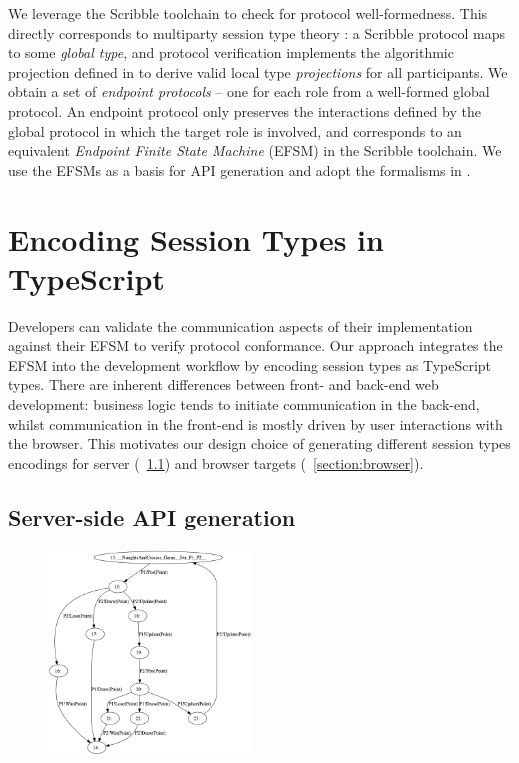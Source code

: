 \documentclass[submission,copyright,creativecommons]{eptcs}
\newcommand{\sectionref}[1]{\textsection~\ref{#1}}
\begin{document}
We leverage the Scribble toolchain to check for protocol
well-formedness.
This directly corresponds to multiparty session
type theory \cite{MPST}: 
a Scribble protocol maps to some \textit{global type}, and protocol verification implements the algorithmic projection
defined in \cite{MPST} to derive valid local type \textit{projections} for all participants.  We obtain a set of \textit{endpoint protocols}
-- one for each role from a well-formed global protocol. An endpoint protocol only preserves the interactions defined by the global protocol in which the target role is involved, and corresponds to an equivalent \textit{Endpoint Finite State Machine} (EFSM) in the Scribble toolchain. We use the EFSMs as a basis for API generation and adopt the formalisms in \cite{Hybrid2016}.


\section{Encoding Session Types in TypeScript}

Developers can validate the communication aspects of their
implementation against their EFSM to verify protocol conformance. Our
approach integrates the EFSM into the development workflow by encoding
session types as TypeScript types.
There are inherent differences between front- and back-end web development: business logic tends to initiate communication in the back-end, whilst communication in the front-end is mostly driven by user interactions with the browser. This motivates our design choice of generating different session types encodings for server (\sectionref{section:server}) and browser targets (\sectionref{section:browser}).

\subsection{Server-side API generation}
\label{section:server}

\begin{figure}
  \begin{center}
    \includegraphics[width=0.48\textwidth]{figures/efsm_svr.png}
  \end{center}

  \label{fig:efsmsvr}
\end{figure}
\end{document}
